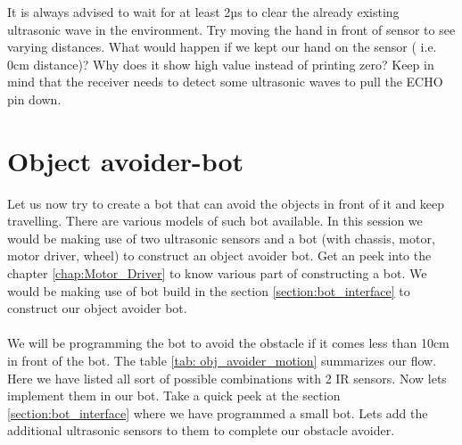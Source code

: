 It is always advised to wait for at least 2µs to clear the already existing ultrasonic wave in the environment. Try moving the hand in front of sensor to see varying distances. What would happen if we kept our hand on the sensor ( i.e. 0cm distance)? Why does it show high value instead of printing zero? Keep in mind that the receiver needs to detect some ultrasonic waves to pull the ECHO pin down.

\section{Object avoider-bot}

Let us now try to create a bot that can avoid the objects in front of it and keep travelling. There are various models of such bot available. In this session we would be making use of two ultrasonic sensors and a bot (with chassis, motor, motor driver, wheel) to construct an object avoider bot. Get an peek into the chapter \ref{chap:Motor_Driver} to know various part of constructing a bot. We would be making use of bot build in the section \ref{section:bot_interface} to construct our object avoider bot.


\paragraph{ } We will be programming the bot to avoid the obstacle if it comes less than 10cm in front of the bot. The table \ref{tab: obj_avoider_motion} summarizes our flow. Here we have listed all sort of possible combinations with 2 IR sensors. Now lets implement them in our bot. Take a quick peek at the section \ref{section:bot_interface} where we have programmed a small bot. Lets add the additional ultrasonic sensors to them to complete our obstacle avoider.

